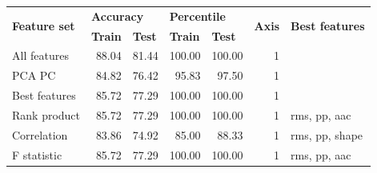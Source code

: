 \begin{table}[]
\begin{tabular}{|l|rr|rr|r|l|}
\hline
\multirow{2}{*}{\textbf{Feature set}} & \multicolumn{2}{l|}{\textbf{Accuracy}}                                   & \multicolumn{2}{l|}{\textbf{Percentile}}                                 & \multicolumn{1}{l|}{\multirow{2}{*}{\textbf{Axis}}} & \multirow{2}{*}{\textbf{Best features}} \\ \cline{2-5}
                                      & \multicolumn{1}{l|}{\textbf{Train}} & \multicolumn{1}{l|}{\textbf{Test}} & \multicolumn{1}{l|}{\textbf{Train}} & \multicolumn{1}{l|}{\textbf{Test}} & \multicolumn{1}{l|}{}                               &                                         \\ \hline
All features                          & \multicolumn{1}{r|}{88.04}          & 81.44                              & \multicolumn{1}{r|}{100.00}         & 100.00                             & 1                                                   &                                         \\ \hline
PCA PC                                & \multicolumn{1}{r|}{84.82}          & 76.42                              & \multicolumn{1}{r|}{95.83}          & 97.50                              & 1                                                   &                                         \\ \hline
Best features                         & \multicolumn{1}{r|}{85.72}          & 77.29                              & \multicolumn{1}{r|}{100.00}         & 100.00                             & 1                                                   &                                         \\ \hline
Rank product                          & \multicolumn{1}{r|}{85.72}          & 77.29                              & \multicolumn{1}{r|}{100.00}         & 100.00                             & 1                                                   & rms, pp, aac                            \\ \hline
Correlation                           & \multicolumn{1}{r|}{83.86}          & 74.92                              & \multicolumn{1}{r|}{85.00}          & 88.33                              & 1                                                   & rms, pp, shape                          \\ \hline
F statistic                           & \multicolumn{1}{r|}{85.72}          & 77.29                              & \multicolumn{1}{r|}{100.00}         & 100.00                             & 1                                                   & rms, pp, aac                            \\ \hline

\end{tabular}
\end{table}

